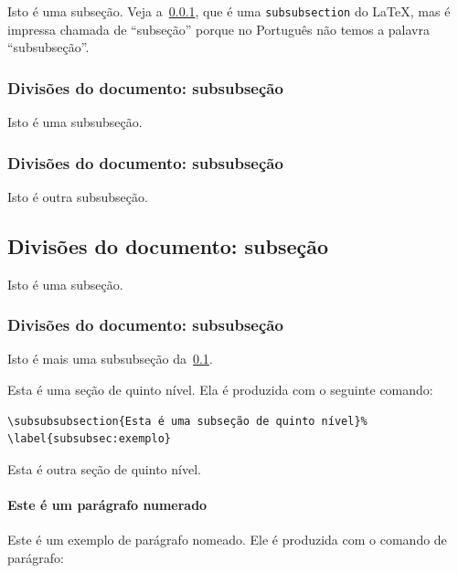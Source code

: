 Isto é uma subseção. Veja a~\cref{subsubsec:divisoes}, que é uma
\texttt{subsubsection} do \LaTeX, mas é impressa chamada de ``subseção'' porque
no Português não temos a palavra ``subsubseção''.

\subsubsection{Divisões do documento:
	subsubseção}%
\label{subsubsec:divisoes}

Isto é uma subsubseção.

\subsubsection{Divisões do documento:
	subsubseção}

Isto é outra subsubseção.

\subsection{Divisões do documento:
	subseção}%
\label{subsec:exemplo}

Isto é uma subseção.

\subsubsection{Divisões do documento:
	subsubseção}

Isto é mais uma subsubseção da~\cref{subsec:exemplo}.

%
\label{subsubsec:exemplo}

Esta é uma seção de quinto nível. Ela é produzida com o seguinte comando:

\begin{verbatim}
\subsubsubsection{Esta é uma subseção de quinto nível}%
\label{subsubsec:exemplo}
\end{verbatim}

%
\label{subsubsubsec:exemplo}

Esta é outra seção de quinto nível.

\paragraph{Este é um parágrafo numerado}%
\label{par:exemplo-paragrafo}

Este é um exemplo de parágrafo nomeado. Ele é produzida com o comando de
parágrafo:

